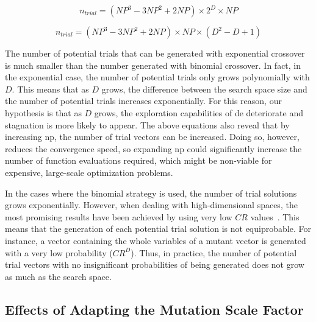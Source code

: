\documentclass[review,3p]{elsarticle}
\newcommand{\DE}{{\sc de}}
\newcommand{\NP}{{\sc np}}
\begin{document}
\begin{equation}
	\label{eq:trials_bin}
		n_{trial} = (NP^3 - 3NP^2 + 2NP) \times 2^D \times NP
\end{equation}

\begin{equation}
	\label{eq:trials_exp}
		n_{trial} = (NP^3 - 3NP^2 + 2NP) \times NP \times (D^2 - D + 1)
\end{equation}

The number of potential trials that can be generated with exponential crossover is much smaller than the
number generated with binomial crossover.
%
In fact, in the exponential case, the number of potential trials only grows polynomially with $D$.
%
This means that as $D$ grows, the difference between the search space size and the number of potential
trials increases exponentially.
%
For this reason, our hypothesis is that as $D$ grows, the exploration capabilities of \DE{} deteriorate
and stagnation is more likely to appear.
%
The above equations also reveal that by increasing \NP{}, the number of trial vectors can be increased.
%
Doing so, however, reduces the convergence speed, so expanding \NP{} could significantly increase the number
of function evaluations required, which might be non-viable for expensive, large-scale optimization problems.

In the cases where the binomial strategy is used, the number of trial solutions grows exponentially.
%
However, when dealing with high-dimensional spaces, the most promising results have been
achieved by using very low $CR$ values~\cite{Olguin:13}.
%
This means that the generation of each potential trial solution is not equiprobable.
%
For instance, a vector containing the whole variables of a mutant vector is generated with a very low
probability ($CR^D$).
%
Thus, in practice, the number of potential trial vectors with no insignificant
probabilities of being generated does not grow as much as the search space.

\subsection{Effects of Adapting the Mutation Scale Factor}
\end{document}
